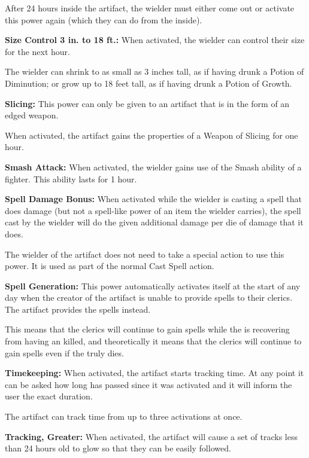 \begin{multicols*}{2}
After 24 hours inside the artifact, the wielder must either come out or activate this power again (which they can do from the inside).

\textbf{Size Control 3 in. to 18 ft.:} When activated, the wielder can control their size for the next hour.

The wielder can shrink to as small as 3 inches tall, as if having drunk a Potion of Diminution; or grow up to 18 feet tall, as if having drunk a Potion of Growth.

\textbf{Slicing:} This power can only be given to an artifact that is in the form of an edged weapon.

When activated, the artifact gains the properties of a Weapon of Slicing for one hour.

\textbf{Smash Attack:} When activated, the wielder gains use of the Smash ability of a fighter. This ability lasts for 1 hour.

\textbf{Spell Damage Bonus:} When activated while the wielder is casting a spell that does damage (but not a spell-like power of an item the wielder carries), the spell cast by the wielder will do the given additional damage per die of damage that it does.

The wielder of the artifact does not need to take a special action to use this power. It is used as part of the normal Cast Spell action.

\textbf{Spell Generation:} This power automatically activates itself at the start of any day when the creator of the artifact is unable to provide spells to their clerics. The artifact provides the spells instead.

This means that the  clerics will continue to gain spells while the  is recovering from having an  killed, and theoretically it means that the clerics will continue to gain spells even if the  truly dies.

\textbf{Timekeeping:} When activated, the artifact starts tracking time. At any point it can be asked how long has passed since it was activated and it will inform the user the exact duration.

The artifact can track time from up to three activations at once.

\textbf{Tracking, Greater:} When activated, the artifact will cause a set of tracks less than 24 hours old to glow so that they can be easily followed.


\end{multicols*}
